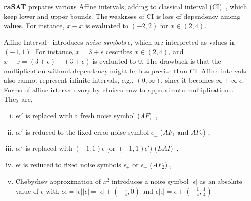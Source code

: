 

{\bf raSAT} prepares various Affine intervals, adding to classical interval (CI)~\cite{moore}, 
which keep lower and upper bounds. The weakness of CI is loss of dependency 
among values. For instance, $x - x$ is evaluated to $(-2,2)$ for $x \in (2,4)$. 

Affine Interval~\cite{af,comba93} introduces \emph{noise symbols} $\epsilon$, 
which are interpreted as values in $(-1,1)$. 
For instance, $x = 3 + \epsilon$ describes $x \in (2,4)$, and 
$x - x = (3 + \epsilon) - (3 + \epsilon)$ is evaluated to $0$. 
The drawback is that the multiplication without dependency might be less precise than CI.
Affine intervals also cannot represent infinite intervals, e.g., $(0,\infty)$, 
since it becomes $\infty + \infty~\epsilon$. 
Forms of affine intervals vary by choices how to approximate multiplications. They are,
\begin{enumerate}[(i)]
\item $\epsilon \epsilon'$ is replaced with a fresh noise symbol 
($AF$)~\cite{StolfiThesis,comba93}, 
\item $\epsilon \epsilon'$ is reduced to the fixed error noise symbol 
$\epsilon_{\pm}$ ($AF_1$ and $AF_2$) \cite{af},
\item $\epsilon \epsilon'$ is replaced with $(-1,1) \epsilon$ 
(or $(-1,1) \epsilon'$) ($EAI$)~\cite{ngocsefm},
\item $\epsilon \epsilon$ is reduced to fixed noise symbols 
$\epsilon_+$ or $\epsilon_{-}$ ($AF_2$) \cite{af}, 
\item Chebyshev approximation of $x^2$ introduces a noise symbol $|\epsilon|$ 
as an absolute value of $\epsilon$ with 
$\epsilon \epsilon = |\epsilon| |\epsilon| = |\epsilon| + (-\frac{1}{4}, 0)$ and
$\epsilon |\epsilon| = \epsilon + (-\frac{1}{4}, \frac{1}{4})$ \cite{tapas12}. 
\end{enumerate} 

